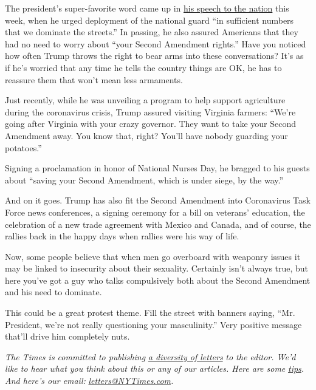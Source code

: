 The president's super-favorite word came up in
\href{https://www.whitehouse.gov/briefings-statements/statement-by-the-president-39/}{his
speech to the nation} this week, when he urged deployment of the
national guard ``in sufficient numbers that we dominate the streets.''
In passing, he also assured Americans that they had no need to worry
about ``your Second Amendment rights.'' Have you noticed how often Trump
throws the right to bear arms into these conversations? It's as if he's
worried that any time he tells the country things are OK, he has to
reassure them that won't mean less armaments.

Just recently, while he was unveiling a program to help support
agriculture during the coronavirus crisis, Trump assured visiting
Virginia farmers: ``We're going after Virginia with your crazy governor.
They want to take your Second Amendment away. You know that, right?
You'll have nobody guarding your potatoes.''

Signing a proclamation in honor of National Nurses Day, he bragged to
his guests about ``saving your Second Amendment, which is under siege,
by the way.''

And on it goes. Trump has also fit the Second Amendment into Coronavirus
Task Force news conferences, a signing ceremony for a bill on veterans'
education, the celebration of a new trade agreement with Mexico and
Canada, and of course, the rallies back in the happy days when rallies
were his way of life.

Now, some people believe that when men go overboard with weaponry issues
it may be linked to insecurity about their sexuality. Certainly isn't
always true, but here you've got a guy who talks compulsively both about
the Second Amendment and his need to dominate.

This could be a great protest theme. Fill the street with banners
saying, ``Mr. President, we're not really questioning your
masculinity.'' Very positive message that'll drive him completely nuts.

\emph{The Times is committed to publishing}
\href{https://www.nytimes3xbfgragh.onion/2019/01/31/opinion/letters/letters-to-editor-new-york-times-women.html}{\emph{a
diversity of letters}} \emph{to the editor. We'd like to hear what you
think about this or any of our articles. Here are some}
\href{https://help.nytimes3xbfgragh.onion/hc/en-us/articles/115014925288-How-to-submit-a-letter-to-the-editor}{\emph{tips}}\emph{.
And here's our email:}
\href{mailto:letters@NYTimes.com}{\emph{letters@NYTimes.com}}\emph{.}

